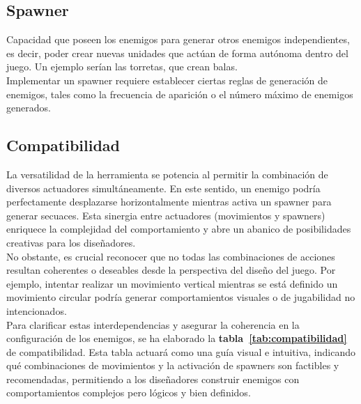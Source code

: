 \subsection{Spawner}
Capacidad que poseen los enemigos para generar otros enemigos independientes, es decir, poder crear nuevas unidades que actúan de forma autónoma dentro del juego. Un ejemplo serían las torretas, que crean balas.\\

Implementar un spawner requiere establecer ciertas reglas de generación de enemigos, tales como la frecuencia de aparición o el número máximo de enemigos generados.
\subsection{Compatibilidad}
La versatilidad de la herramienta se potencia al permitir la combinación de diversos actuadores simultáneamente. En este sentido, un enemigo podría perfectamente desplazarse horizontalmente mientras activa un spawner para generar secuaces. Esta sinergia entre actuadores (movimientos y spawners) enriquece la complejidad del comportamiento y abre un abanico de posibilidades creativas para los diseñadores.\\

No obstante, es crucial reconocer que no todas las combinaciones de acciones resultan coherentes o deseables desde la perspectiva del diseño del juego. Por ejemplo, intentar realizar un movimiento vertical mientras se está definido un movimiento circular podría generar comportamientos visuales o de jugabilidad no intencionados. \\

Para clarificar estas interdependencias y asegurar la coherencia en la configuración de los enemigos, se ha elaborado la \textbf{tabla~\ref{tab:compatibilidad}} de compatibilidad. Esta tabla actuará como una guía visual e intuitiva, indicando qué combinaciones de movimientos y la activación de spawners son factibles y recomendadas, permitiendo a los diseñadores construir enemigos con comportamientos complejos pero lógicos y bien definidos.

